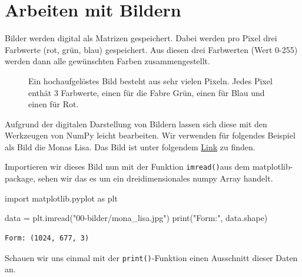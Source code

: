 \documentclass[
  letterpaper,
  DIV=11,
  numbers=noendperiod]{scrreprt}
\newenvironment{Shaded}{\begin{snugshade}}{\end{snugshade}}
\newcommand{\BuiltInTok}[1]{\textcolor[rgb]{0.00,0.23,0.31}{#1}}
\newcommand{\ImportTok}[1]{\textcolor[rgb]{0.00,0.46,0.62}{#1}}
\newcommand{\NormalTok}[1]{\textcolor[rgb]{0.00,0.23,0.31}{#1}}
\newcommand{\OperatorTok}[1]{\textcolor[rgb]{0.37,0.37,0.37}{#1}}
\newcommand{\StringTok}[1]{\textcolor[rgb]{0.13,0.47,0.30}{#1}}
\begin{document}
\chapter{Arbeiten mit Bildern}\label{arbeiten-mit-bildern}

Bilder werden digital als Matrizen gespeichert. Dabei werden pro Pixel
drei Farbwerte (rot, grün, blau) gespeichert. Aus diesen drei Farbwerten
(Wert 0-255) werden dann alle gewünschten Farben zusammengestellt.

\begin{figure}


\caption{\label{fig-pixel_colors}Ein hochaufgelöstes Bild besteht aus
sehr vielen Pixeln. Jedes Pixel enthät 3 Farbwerte, einen für die Fabre
Grün, einen für Blau und einen für Rot.}

\end{figure}%

Aufgrund der digitalen Darstellung von Bildern lassen sich diese mit den
Werkzeugen von NumPy leicht bearbeiten. Wir verwenden für folgendes
Beispiel als Bild die Monas Lisa. Das Bild ist unter folgendem
\href{https://upload.wikimedia.org/wikipedia/commons/thumb/6/6a/Mona_Lisa.jpg/677px-Mona_Lisa.jpg}{Link}
zu finden.

Importieren wir dieses Bild nun mit der Funktion \texttt{imread()}aus
dem matplotlib-package, sehen wir das es um ein dreidimensionales numpy
Array handelt.

\begin{Shaded}
\begin{Highlighting}[]
\ImportTok{import}\NormalTok{ matplotlib.pyplot }\ImportTok{as}\NormalTok{ plt}

\NormalTok{data }\OperatorTok{=}\NormalTok{ plt.imread(}\StringTok{"00{-}bilder/mona\_lisa.jpg"}\NormalTok{)}
\BuiltInTok{print}\NormalTok{(}\StringTok{"Form:"}\NormalTok{, data.shape)}
\end{Highlighting}
\end{Shaded}

\begin{verbatim}
Form: (1024, 677, 3)
\end{verbatim}

Schauen wir uns einmal mit der \texttt{print()}-Funktion einen
Ausschnitt dieser Daten an.
\end{document}
